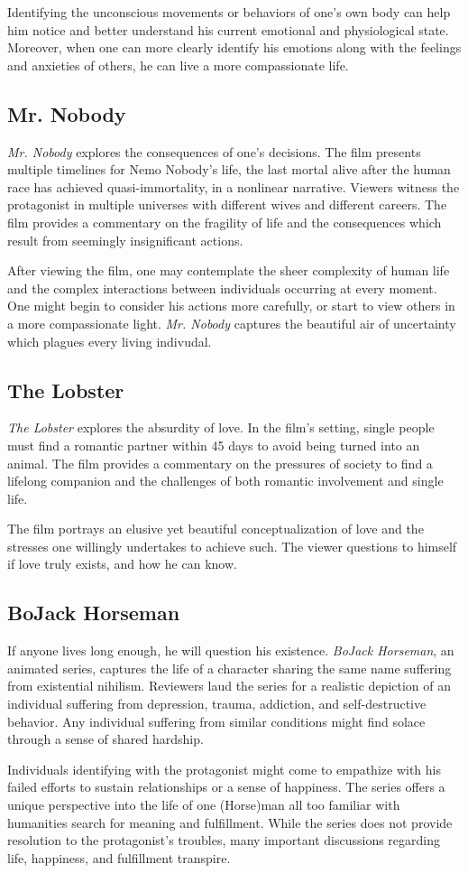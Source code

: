 \documentclass{article}
\begin{document}
Identifying the unconscious movements or behaviors of one's own body can help him notice and better understand his current emotional and physiological state. Moreover, when one can more clearly identify his emotions along with the feelings and anxieties of others, he can live a more compassionate life. 

\subsection{Mr. Nobody}
\textit{Mr. Nobody} explores the consequences of one's decisions. The film presents multiple timelines for Nemo Nobody's life, the last mortal alive after the human race has achieved quasi-immortality, in a nonlinear narrative. Viewers witness the protagonist in multiple universes with different wives and different careers. The film provides a commentary on the fragility of life and the consequences which result from seemingly insignificant actions. 

After viewing the film, one may contemplate the sheer complexity of human life and the complex interactions between individuals occurring at every moment. One might begin to consider his actions more carefully, or start to view others in a more compassionate light. \textit{Mr. Nobody} captures the beautiful air of uncertainty which plagues every living indivudal. 

\subsection{The Lobster}
\textit{The Lobster} explores the absurdity of love. In the film's setting, single people must find a romantic partner within 45 days to avoid being turned into an animal. The film provides a commentary on the pressures of society to find a lifelong companion and the challenges of both romantic involvement and single life. 

The film portrays an elusive yet beautiful conceptualization of love and the stresses one willingly undertakes to achieve such. The viewer questions to himself if love truly exists, and how he can know. 
\subsection{BoJack Horseman}
If anyone lives long enough, he will question his existence. \textit{BoJack Horseman}, an animated series, captures the life of a character sharing the same name suffering from existential nihilism. Reviewers laud the series for a realistic depiction of an individual suffering from depression, trauma, addiction, and self-destructive behavior. Any individual suffering from similar conditions might find solace through a sense of shared hardship. 

Individuals identifying with the protagonist might come to empathize with his failed efforts to sustain relationships or a sense of happiness. The series offers a unique perspective into the life of one (Horse)man all too familiar with humanities search for meaning and fulfillment. While the series does not provide resolution to the protagonist's troubles, many important discussions regarding life, happiness, and fulfillment transpire. 

\newpage
\nocite{*}
\printbibliography
\end{document}

